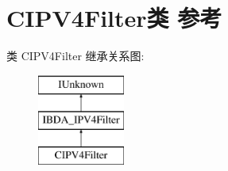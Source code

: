 \hypertarget{class_c_i_p_v4_filter}{}\section{C\+I\+P\+V4\+Filter类 参考}
\label{class_c_i_p_v4_filter}
类 C\+I\+P\+V4\+Filter 继承关系图\+:\begin{figure}[H]
\begin{center}
\leavevmode
\includegraphics[height=3.000000cm]{class_c_i_p_v4_filter}
\end{center}
\end{figure}
